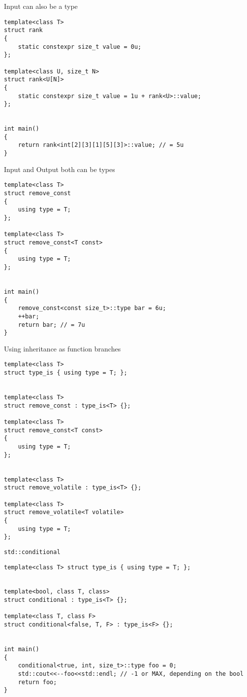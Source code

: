 \documentclass{beamer}
\begin{document}
\begin{frame}[fragile]{Input can also be a type}
\begin{lstlisting}
template<class T>
struct rank
{
	static constexpr size_t value = 0u;
};

template<class U, size_t N>
struct rank<U[N]>
{
	static constexpr size_t value = 1u + rank<U>::value;
};


int main()
{
	return rank<int[2][3][1][5][3]>::value; // = 5u
}
\end{lstlisting}
\end{frame}

\begin{frame}[fragile]{Input and Output both can be types}
\begin{lstlisting}
template<class T>
struct remove_const
{
	using type = T;
};

template<class T>
struct remove_const<T const>
{
	using type = T;
};


int main()
{
	remove_const<const size_t>::type bar = 6u;
	++bar;
	return bar; // = 7u
}
\end{lstlisting}
\end{frame}

\begin{frame}[fragile]{Using inheritance as function branches}
\begin{lstlisting}
template<class T>
struct type_is { using type = T; };


template<class T>
struct remove_const : type_is<T> {};

template<class T>
struct remove_const<T const>
{
	using type = T;
};


template<class T>
struct remove_volatile : type_is<T> {};

template<class T>
struct remove_volatile<T volatile>
{
	using type = T;
};
\end{lstlisting}
\end{frame}

\begin{frame}[fragile]{\texttt{std::conditional}}
\begin{lstlisting}
template<class T> struct type_is { using type = T; };


template<bool, class T, class>
struct conditional : type_is<T> {};

template<class T, class F>
struct conditional<false, T, F> : type_is<F> {};


int main()
{
	conditional<true, int, size_t>::type foo = 0;
	std::cout<<--foo<<std::endl; // -1 or MAX, depending on the bool
	return foo;
}
\end{lstlisting}
\end{frame}
\end{document}
